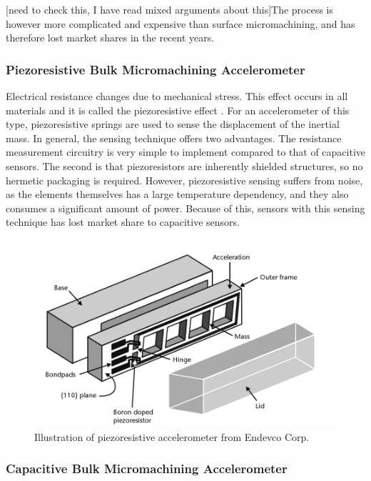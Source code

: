 [need to check this, I have read mixed arguments about this]The process is however more complicated and expensive than surface micromachining, and has therefore lost market shares in the recent years.

\subsubsection{Piezoresistive Bulk Micromachining Accelerometer}

Electrical resistance changes due to mechanical stress. This effect occurs in all materials and it is called the piezoresistive effect \cite[p.~73]{kaajakari09}. For an accelerometer of this type, piezoresistive springs are used to sense the displacement of the inertial mass. In general, the sensing technique offers two advantages. The resistance measurement circuitry is very simple to implement compared to that of capacitive sensors. The second is that piezoresistors are inherently shielded structures, so no hermetic packaging is required. However, piezoresistive sensing suffers from noise, as the elements themselves has a large temperature dependency, and they also consumes a significant amount of power. Because of this, sensors with this sensing technique has lost market share to capacitive sensors.

\begin{figure}[h]
\centering
\includegraphics[scale=0.3]{fig/piezoresistive.png}
\caption{Illustration of piezoresistive accelerometer from Endevco Corp. \cite[p.~98]{maluf04}}
\label{fig:piezoresistive_accel}
\end{figure}

\subsubsection{Capacitive Bulk Micromachining Accelerometer}

